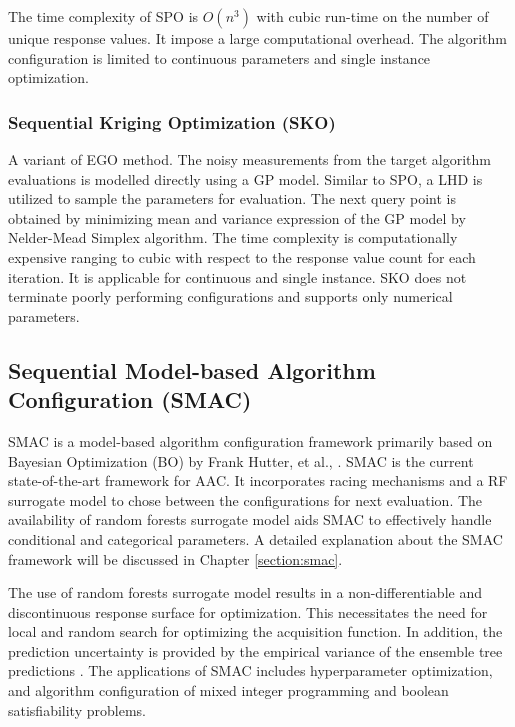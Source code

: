 The time complexity of SPO is $O(n^3)$ with cubic run-time on the number of unique response values. It impose a large computational overhead. The algorithm configuration is limited to continuous parameters and single instance optimization. 

\subsubsection{Sequential Kriging Optimization (SKO)}

A variant of EGO method. The noisy measurements from the target algorithm evaluations is modelled directly using a GP model. Similar to SPO, a LHD is utilized to sample the parameters for evaluation. The next query point is obtained by minimizing mean and variance expression of the GP model by Nelder-Mead Simplex algorithm. The time complexity is computationally expensive ranging to cubic with respect to the response value count for each iteration. It is applicable for continuous and single instance. SKO does not terminate poorly performing configurations and supports only numerical parameters.

\subsection{Sequential Model-based Algorithm Configuration (SMAC)}

SMAC is a model-based algorithm configuration framework primarily based on Bayesian Optimization (BO) by Frank Hutter, et al., \cite{SMAC_mainpaper}. SMAC is the current state-of-the-art framework for AAC. It incorporates racing mechanisms and a RF surrogate model to chose between the configurations for next evaluation. The availability of random forests surrogate model aids SMAC to effectively handle conditional and categorical parameters. A detailed explanation about the SMAC framework will be discussed in Chapter \ref{section:smac}.  

The use of random forests surrogate model results in a non-differentiable and discontinuous response surface for optimization. This necessitates the need for local and random search for optimizing the acquisition function. In addition, the prediction uncertainty is provided by the empirical variance of the ensemble tree predictions \cite{Bayesianoptimization_review}. The applications of SMAC includes hyperparameter optimization, and algorithm configuration of mixed integer programming and boolean satisfiability problems.

